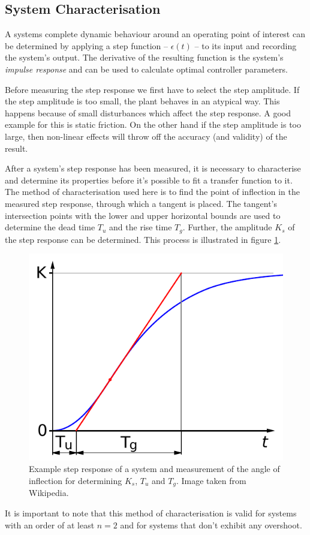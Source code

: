\subsection{System Characterisation}
\label{sec:characterisation}

A systems complete dynamic behaviour around an operating point of interest can
be determined by applying a step function -- $\epsilon(t)$ -- to its input and
recording the system's output. The derivative of the resulting function is the
system's  \textit{impulse  response}  and  can  be  used  to calculate optimal
controller parameters.

Before measuring the step response we first have to select the step amplitude.
If the step amplitude is too small, the plant behaves in an atypical way. This
happens because of small disturbances  which  affect the step response. A good
example for this is static friction. On the  other  hand if the step amplitude
is  too  large,  then  non-linear  effects  will throw off the  accuracy  (and
validity) of the result.

After  a system's  step  response  has  been  measured,  it  is  necessary  to
characterise  and  determine  its  properties before it's possible  to  fit  a
transfer function to it. The method  of  characterisation used here is to find
the point of inflection in the measured step response, through which a tangent
is placed.  The  tangent's  intersection  points  with  the  lower  and  upper
horizontal bounds  are used to determine the dead time $T_u$ and the rise time
$T_g$.  Further, the amplitude $K_s$ of the step response can  be  determined.
This process is illustrated in figure \ref{fig:tu-tg-example}.

\begin{figure}[t]
    \centering
    \includegraphics[width=\imagewidth]{images/tu_tg_example}
    \caption{Example step response of a system and measurement of the angle of inflection for determining $K_s$, $T_u$ and $T_g$. Image taken from Wikipedia\cite{ref:tu-tg}.}
    \label{fig:tu-tg-example}
\end{figure}

It is important to note that this method  of  characterisation  is  valid  for
systems with an order of at least $n=2$ and for systems that don't exhibit any
overshoot.

